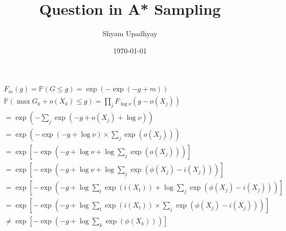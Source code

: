\documentclass[a4paper]{article}
\author{Shyam Upadhyay}
\date{\today}
\title{Question in A* Sampling}
\renewcommand{\Pr}{\mathbb{P}} %
\begin{document}
\maketitle
\begin{align*}
F_m(g) = \Pr(G\le g) = \exp(-\exp(-g+m)) \tag{CDF for $Gumbel(m)$}\\
\Pr(\max G_k + o(X_k) \le g) = \prod_j F_{\log \nu} (g-o(X_j)) \tag{as $G_k \sim Gumbel(\log\nu)$ }\\
= \exp(-\sum_j \exp(-g + o(X_j) + \log \nu)) \\
= \exp\left(-\exp(-g + \log \nu) \times \sum_j \exp(o(X_j))\right)\\
= \exp\left[-\exp\left(-g + \log \nu + \log \sum_j \exp(o(X_j))\right)\right] \\
= \exp\left[-\exp\left(-g + \log \nu + \log \sum_j \exp(\phi(X_j) - i(X_j))\right)\right] \\
= \exp\left[-\exp\left(-g + \log \sum_t \exp(i(X_t)) + \log \sum_j \exp(\phi(X_j) - i(X_j))\right)\right] \\
= \exp\left[-\exp\left(-g + \log \sum_t \exp(i(X_t)) \times \sum_j \exp(\phi(X_j) - i(X_j))\right)\right] \\
\neq \exp\left[-\exp\left(-g + \log \sum_k \exp(\phi(X_k)) \right) \right] \tag{but this should be equal! right?}
\end{align*}
\end{document}
